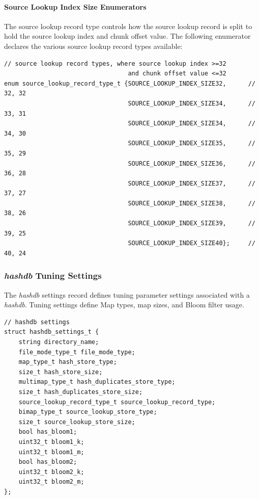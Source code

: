 \documentclass[12pt,twoside]{article}
\newcommand{\hdb}{\emph{hashdb}\xspace}
\begin{document}
\paragraph{Source Lookup Index Size Enumerators}
The source lookup record type controls how the source lookup record
is split to hold the source lookup index and chunk offset value.
The following enumerator declares the various source lookup record types available:
\begin{small}
\begin{verbatim}
// source lookup record types, where source lookup index >=32
                                  and chunk offset value <=32
enum source_lookup_record_type_t {SOURCE_LOOKUP_INDEX_SIZE32,      // 32, 32
                                  SOURCE_LOOKUP_INDEX_SIZE34,      // 33, 31
                                  SOURCE_LOOKUP_INDEX_SIZE34,      // 34, 30
                                  SOURCE_LOOKUP_INDEX_SIZE35,      // 35, 29
                                  SOURCE_LOOKUP_INDEX_SIZE36,      // 36, 28
                                  SOURCE_LOOKUP_INDEX_SIZE37,      // 37, 27
                                  SOURCE_LOOKUP_INDEX_SIZE38,      // 38, 26
                                  SOURCE_LOOKUP_INDEX_SIZE39,      // 39, 25
                                  SOURCE_LOOKUP_INDEX_SIZE40};     // 40, 24
\end{verbatim}
\end{small}



\subsubsection{\hdb Tuning Settings}
The \hdb settings record defines tuning parameter settings
associated with a \hdb.
Tuning settings define Map types, map sizes, and Bloom filter usage.
\begin{small}
\begin{verbatim}
// hashdb settings
struct hashdb_settings_t {
    string directory_name;
    file_mode_type_t file_mode_type;
    map_type_t hash_store_type;
    size_t hash_store_size;
    multimap_type_t hash_duplicates_store_type;
    size_t hash_duplicates_store_size;
    source_lookup_record_type_t source_lookup_record_type;
    bimap_type_t source_lookup_store_type;
    size_t source_lookup_store_size;
    bool has_bloom1;
    uint32_t bloom1_k;
    uint32_t bloom1_m;
    bool has_bloom2;
    uint32_t bloom2_k;
    uint32_t bloom2_m;
};
\end{verbatim}
\end{small}
\end{document}
